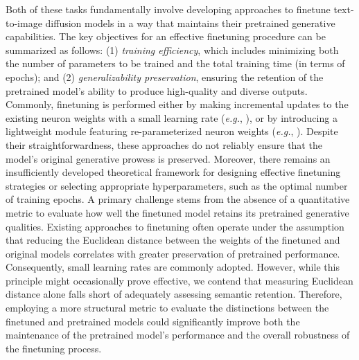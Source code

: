 \begin{itemize}[leftmargin=*,nosep]
\begin{itemize}[leftmargin=*,nosep]
Both of these tasks fundamentally involve developing approaches to finetune text-to-image diffusion models in a way that maintains their pretrained generative capabilities. The key objectives for an effective finetuning procedure can be summarized as follows: (1) \emph{training efficiency}, which includes minimizing both the number of parameters to be trained and the total training time (in terms of epochs); and (2) \emph{generalizability preservation}, ensuring the retention of the pretrained model's ability to produce high-quality and diverse outputs. Commonly, finetuning is performed either by making incremental updates to the existing neuron weights with a small learning rate (\emph{e.g.}, \cite{ruiz2023dreambooth}), or by introducing a lightweight module featuring re-parameterized neuron weights (\emph{e.g.}, \cite{hulora2022,zhang2023adding}). Despite their straightforwardness, these approaches do not reliably ensure that the model's original generative prowess is preserved. Moreover, there remains an insufficiently developed theoretical framework for designing effective finetuning strategies or selecting appropriate hyperparameters, such as the optimal number of training epochs. A primary challenge stems from the absence of a quantitative metric to evaluate how well the finetuned model retains its pretrained generative qualities. Existing approaches to finetuning often operate under the assumption that reducing the Euclidean distance between the weights of the finetuned and original models correlates with greater preservation of pretrained performance. Consequently, small learning rates are commonly adopted. However, while this principle might occasionally prove effective, we contend that measuring Euclidean distance alone falls short of adequately assessing semantic retention. Therefore, employing a more structural metric to evaluate the distinctions between the finetuned and pretrained models could significantly improve both the maintenance of the pretrained model's performance and the overall robustness of the finetuning process.


\end{itemize}
\end{itemize}
